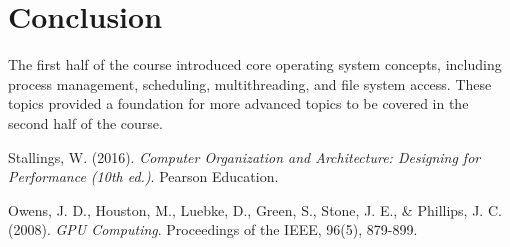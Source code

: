 \documentclass[12pt]{article}
\begin{document}
\section{Conclusion}
The first half of the course introduced core operating system concepts, including process management, scheduling, multithreading, and file system access. These topics provided a foundation for more advanced topics to be covered in the second half of the course.

\begin{thebibliography}{3}
    Stallings, W. (2016). \textit{Computer Organization and Architecture: Designing for Performance (10th ed.)}. Pearson Education. 

    Owens, J. D., Houston, M., Luebke, D., Green, S., Stone, J. E., & Phillips, J. C. (2008). \textit{GPU Computing}. Proceedings of the IEEE, 96(5), 879-899.

\end{thebibliography}
\end{document}
